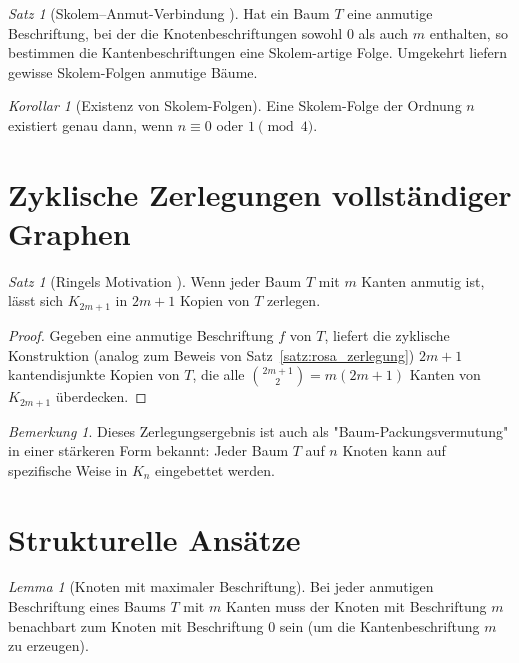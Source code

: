\documentclass[12pt,a4paper]{amsart}
\theoremstyle{definition}
\theoremstyle{remark}
\newtheorem{satz}[theorem]{Satz}
\newtheorem{korollar}[theorem]{Korollar}
\newtheorem{lemma_de}[theorem]{Lemma}
\newtheorem{bemerkung}[theorem]{Bemerkung}
\begin{document}
\begin{satz}[Skolem--Anmut-Verbindung \cite{Abrham1991}]\label{satz:skolem_anmutig}
Hat ein Baum $T$ eine anmutige Beschriftung, bei der die Knotenbeschriftungen sowohl
$0$ als auch $m$ enthalten, so bestimmen die Kantenbeschriftungen eine Skolem-artige
Folge. Umgekehrt liefern gewisse Skolem-Folgen anmutige Bäume.
\end{satz}

\begin{korollar}[Existenz von Skolem-Folgen]\label{kor:skolem_ex}
Eine Skolem-Folge der Ordnung $n$ existiert genau dann, wenn $n \equiv 0$ oder
$1 \pmod 4$.
\end{korollar}

\section{Zyklische Zerlegungen vollständiger Graphen}\label{sec:zerlegung}

\begin{satz}[Ringels Motivation \cite{RingelKotzig1964}]\label{satz:ringel}
Wenn jeder Baum $T$ mit $m$ Kanten anmutig ist, lässt sich $K_{2m+1}$ in $2m+1$
Kopien von $T$ zerlegen.
\end{satz}

\begin{proof}
Gegeben eine anmutige Beschriftung $f$ von $T$, liefert die zyklische Konstruktion
(analog zum Beweis von Satz~\ref{satz:rosa_zerlegung}) $2m+1$ kantendisjunkte Kopien
von $T$, die alle $\binom{2m+1}{2} = m(2m+1)$ Kanten von $K_{2m+1}$ überdecken.
\end{proof}

\begin{bemerkung}
Dieses Zerlegungsergebnis ist auch als "Baum-Packungsvermutung" in einer stärkeren
Form bekannt: Jeder Baum $T$ auf $n$ Knoten kann auf spezifische Weise in $K_n$
eingebettet werden.
\end{bemerkung}

\section{Strukturelle Ansätze}\label{sec:strukturell}

\begin{lemma_de}[Knoten mit maximaler Beschriftung]\label{lem:max_beschriftung}
Bei jeder anmutigen Beschriftung eines Baums $T$ mit $m$ Kanten muss der Knoten
mit Beschriftung $m$ benachbart zum Knoten mit Beschriftung $0$ sein
(um die Kantenbeschriftung $m$ zu erzeugen).
\end{lemma_de}
\end{document}
